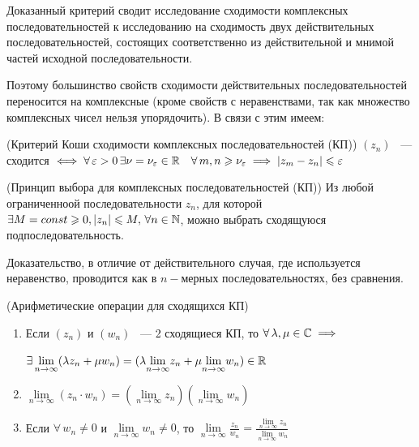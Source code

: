 \documentclass[../../main.tex]{subfiles}
\begin{document}
\begin{rem}
	Доказанный критерий сводит исследование сходимости комплексных
	 последовательностей к исследованию на сходимость двух действительных
	 последовательностей, состоящих соответственно из действительной и мнимой
	 частей исходной последовательности.
	
	Поэтому большинство свойств сходимости действительных последовательностей 
	 переносится на комплексные (кроме свойств с неравенствами, так как множество
	 комплексных чисел нельзя упорядочить). В связи с этим имеем:
	
	\begin{thm}(Критерий Коши сходимости комплексных последовательностей (КП))
		$ (z_n) $ ~---  сходится $ \iff \forall\, \varepsilon > 0\, \exists \nu = \nu_\varepsilon 
		\in \mathbb{R} \quad \forall\, m, n \geqslant \nu_\varepsilon \implies |z_m - z_n| \leqslant \varepsilon $
	\end{thm} 

	\begin{thm}(Принцип выбора для комплексных последовательностей (КП))		
		Из любой ограниченноой последовательности $ z_n $, для которой $ \exists M = 
		const \geqslant 0, |z_n| \leqslant M,\, \forall n \in \mathbb{N} $, можно выбрать сходящуюся 
		подпоследовательность.
		
		Доказательство, в отличие от действительного случая, где используется 
		неравенство, проводится как в $ n-\text{мерных} $ последовательностях, без 
		сравнения.
	\end{thm}

	\begin{thm}(Арифметические операции для сходящихся КП)
		\begin{enumerate}
			\item Если $ (z_n) $ и $ (w_n) $ ~--- 2 сходящиеся КП, то $ \forall\, 
			\lambda, \mu \in \mathbb{C} \implies $
			
			$ \exists\, \underset{n \to \infty}{\lim} (\lambda z_n + \mu w_n) = 
			(\lambda \underset{n \to \infty}{\lim}z_n + \mu \underset{n \to 
			\infty}{\lim}w_n) \in \mathbb{R} $
			
			\item $ \underset{n \to \infty}{\lim} (z_n \cdot w_n) = (\underset{n \to 
			\infty}{\lim} z_n)(\underset{n \to \infty}{\lim} w_n) $
			
			\item Если $ \forall\, w_n \neq 0 $ и $ \underset{n \to \infty}{\lim} w_n 
			\neq 0 $, то $ \underset{n \to \infty}{\lim} \frac{z_n}{w_n} = 
			\frac{\underset{n \to \infty}{\lim} z_n}{\underset{n \to \infty}{\lim} w_n} 
			$
		\end{enumerate}
	\end{thm}
\end{rem}
\end{document}
